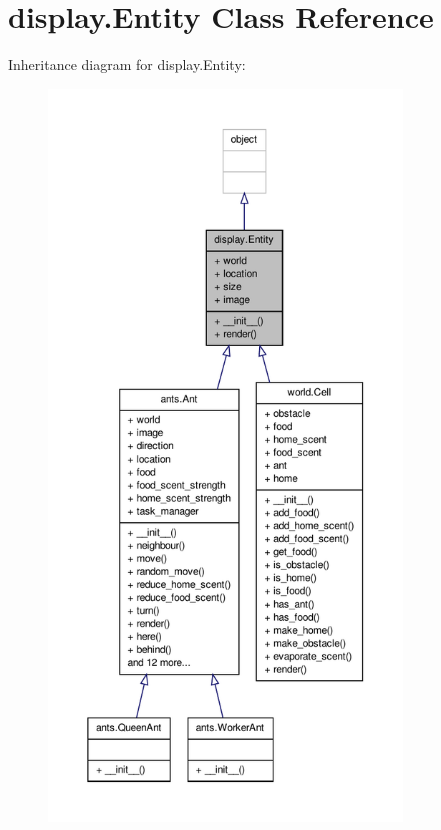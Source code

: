 \hypertarget{classdisplay_1_1Entity}{\section{display.\+Entity Class Reference}
\label{classdisplay_1_1Entity}
}


Inheritance diagram for display.\+Entity\+:
\nopagebreak
\begin{figure}[H]
\begin{center}
\leavevmode
\includegraphics[height=550pt]{classdisplay_1_1Entity__inherit__graph}
\end{center}
\end{figure}


